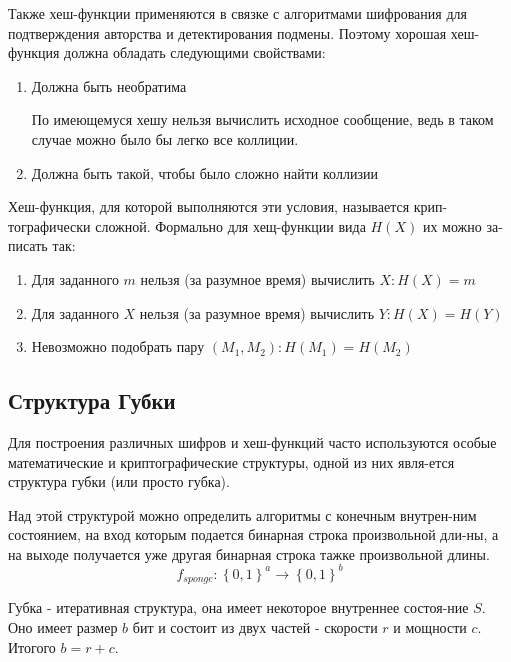 \documentclass[a4paper]{article}
\begin{document}
  Также хеш-функции применяются в связке с алгоритмами шифрования для подтверждения
  авторства и детектирования подмены. Поэтому хорошая хеш-функция должна обладать следующими
  свойствами:

  \begin{enumerate}
    \item {
      Должна быть необратима

      По имеющемуся хешу нельзя вычислить исходное сообщение, ведь в таком случае
      можно было бы легко все коллиции.
    }
    \item {
      Должна быть такой, чтобы было сложно найти коллизии
    }
  \end{enumerate}

  Хеш-функция, для которой выполняются эти условия, называется крип-тографически
  сложной. Формально для хещ-функции вида $H(X)$ их можно за-писать так:

  \begin{enumerate}
    \item Для заданного $m$  нельзя (за разумное время) вычислить $X: H(X) = m$
    \item Для заданного $X$ нельзя (за разумное время) вычислить $Y: H(X) = H(Y)$
    \item Невозможно подобрать пару $\left(M_1, M_2\right): H(M_1) = H(M_2)$
  \end{enumerate}

  \subsection{Структура Губки}

  Для построения различных шифров и хеш-функций часто используются особые
  математические и криптографические структуры, одной из них явля-ется
  структура губки (или просто губка).

  Над этой структурой можно определить алгоритмы с конечным внутрен-ним
  состоянием, на вход которым подается бинарная строка произвольной дли-ны, 
  а на выходе получается уже другая бинарная строка тажке произвольной длины.
  \begin{equation}
    f_{sponge}: \left\{0, 1\right\}^a \rightarrow \left\{0, 1\right\}^b
  \end{equation}

  Губка - итеративная структура, она имеет некоторое внутреннее состоя-ние $S$.
  Оно имеет размер $b$ бит и состоит из двух частей - скорости $r$ и мощности
  $c$. Итогого $b = r + c$.
\end{document}
